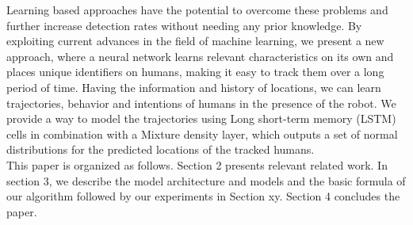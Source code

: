 Learning based approaches have the potential to overcome these problems and further increase detection rates without needing any prior knowledge.
By exploiting current advances in the field of machine learning, we present a new approach, where a neural network learns relevant characteristics on its own and places unique identifiers on humans, making it easy to track them over a long period of time.
Having the information and history of locations, we can learn trajectories, behavior and intentions of humans in the presence of the robot. 
We provide a way to model the trajectories using Long short-term memory (LSTM) cells in combination with a Mixture density layer, which outputs a set of normal distributions for the predicted locations of the tracked humans.\\
This paper is organized as follows.
Section 2 presents relevant related work.
In section 3, we describe the model architecture and models and the basic formula of our algorithm followed by our experiments in Section xy.
Section 4 concludes the paper.

